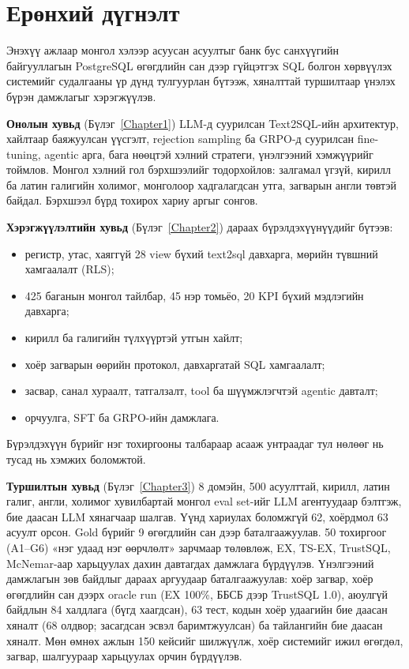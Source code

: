 \titleformat{\section}{\Large\bfseries\filcenter}{}{0pt}{}


\section*{Ерөнхий дүгнэлт}

Энэхүү ажлаар монгол хэлээр асуусан асуултыг банк бус санхүүгийн байгууллагын PostgreSQL өгөгдлийн сан дээр
гүйцэтгэх SQL болгон хөрвүүлэх системийг судалгааны үр дүнд тулгуурлан бүтээж, хяналттай туршилтаар үнэлэх бүрэн
дамжлагыг хэрэгжүүлэв.

\textbf{Онолын хувьд} (Бүлэг~\ref{Chapter1}) LLM-д суурилсан Text2SQL-ийн архитектур, хайлтаар баяжуулсан үүсгэлт,
rejection sampling ба GRPO-д суурилсан fine-tuning, agentic арга, бага нөөцтэй хэлний стратеги, үнэлгээний хэмжүүрийг
тоймлов. Монгол хэлний гол бэрхшээлийг тодорхойлов: залгамал үгзүй, кирилл ба латин галигийн холимог, монголоор
хадгалагдсан утга, загварын англи төвтэй байдал. Бэрхшээл бүрд тохирох хариу аргыг сонгов.

\textbf{Хэрэгжүүлэлтийн хувьд} (Бүлэг~\ref{Chapter2}) дараах бүрэлдэхүүнүүдийг бүтээв:
\begin{itemize}
  \item регистр, утас, хаяггүй 28 view бүхий text2sql давхарга, мөрийн түвшний хамгаалалт (RLS);
  \item 425 баганын монгол тайлбар, 45 нэр томьёо, 20 KPI бүхий мэдлэгийн давхарга;
  \item кирилл ба галигийн түлхүүртэй утгын хайлт;
  \item хоёр загварын өөрийн протокол, давхаргатай SQL хамгаалалт;
  \item засвар, санал хураалт, татгалзалт, tool ба шүүмжлэгчтэй agentic давталт;
  \item орчуулга, SFT ба GRPO-ийн дамжлага.
\end{itemize}
Бүрэлдэхүүн бүрийг нэг тохиргооны талбараар асааж унтраадаг тул нөлөөг нь тусад нь хэмжих боломжтой.

\textbf{Туршилтын хувьд} (Бүлэг~\ref{Chapter3}) 8 домэйн, 500 асуулттай, кирилл, латин галиг, англи, холимог
хувилбартай монгол eval set-ийг LLM агентуудаар бэлтгэж, бие даасан LLM хянагчаар шалгав. Үүнд хариулах боломжгүй 62, хоёрдмол 63 асуулт орсон. Gold бүрийг 9 өгөгдлийн
сан дээр баталгаажуулав. 50 тохиргоог (A1--G6) «нэг удаад нэг өөрчлөлт» зарчмаар төлөвлөж, EX, TS-EX, TrustSQL,
McNemar-аар харьцуулах дахин давтагдах дамжлага бүрдүүлэв. Үнэлгээний дамжлагын зөв байдлыг дараах аргуудаар
баталгаажуулав: хоёр загвар, хоёр өгөгдлийн сан дээрх oracle run (EX 100\%, ББСБ дээр TrustSQL 1.0), аюулгүй байдлын 84
халдлага (бүгд хаагдсан), 63 тест, кодын хоёр удаагийн бие даасан хяналт (68 олдвор; засагдсан эсвэл баримтжуулсан)
ба тайлангийн бие даасан хяналт. Мөн өмнөх ажлын 150 кейсийг шилжүүлж, хоёр
системийг ижил өгөгдөл, загвар, шалгуураар харьцуулах орчин бүрдүүлэв.

